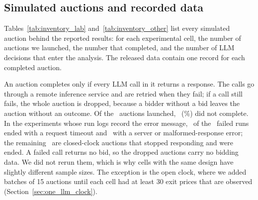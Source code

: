 \documentclass[acmsmall,screen,review]{acmart}
\newif\ifrevisionmark \revisionmarktrue
\newenvironment{revblock}{\color{blue}}{}
\newenvironment{revblock}{}{}
\begin{document}
\begin{revblock}
\subsection{Simulated auctions and recorded data}\label{app:data_inventory}
Tables~\ref{tab:inventory_lab} and~\ref{tab:inventory_other} list every simulated auction behind the reported results: for each experimental cell, the number of auctions we launched, the number that completed, and the number of LLM decisions that enter the analysis. The released data contain one record for each completed auction.

An auction completes only if every LLM call in it returns a response. The calls go through a remote inference service and are retried when they fail; if a call still fails, the whole auction is dropped, because a bidder without a bid leaves the auction without an outcome. Of the \InvAttempted\ auctions launched, \InvFailed\ (\InvFailedPct\%) did not complete. In the experiments whose run logs record the error message, \InvTimeout\ of the \InvFailedRuns\ failed runs ended with a request timeout and \InvServer\ with a server or malformed-response error; the remaining \InvStalled\ are closed-clock auctions that stopped responding and were ended. A failed call returns no bid, so the dropped auctions carry no bidding data. We did not rerun them, which is why cells with the same design have slightly different sample sizes. The exception is the open clock, where we added batches of 15 auctions until each cell had at least 30 exit prices that are observed (Section~\ref{sec:one_llm_clock}).

\begin{table}[htbp]
\centering
\small
\ifrevisionmark\color{blue}\fi
\resizebox{\linewidth}{!}{}
\caption{\textbf{Auctions in the laboratory formats}, $N=3$ bidders, one round per auction. Each cell gives completed / attempted auctions, with the number of LLM decisions used in the analysis in parentheses. Sealed-bid private-value auctions contribute three bids each. Common-value auctions contribute one winner profit each. Clock auctions have one LLM bidder and contribute one exit price each; in the open clock, auctions the LLM wins end before it exits and are not used, so the open-clock attempts include the added batches. $^{r}$: replacement model (Section~\ref{sec:models}). All non-GPT-4o models run at $T=0.5$.}
\label{tab:inventory_lab}
\end{table}

\begin{table}[htbp]
\centering
\small
\ifrevisionmark\color{blue}\fi

\caption{\textbf{Auctions in the other experiments.} Decisions used: winner profits (common value), bids (repeated auctions and description experiments), and auction trajectories (eBay-style). Repeated auctions run sessions of 15 rounds with three bidders. The standard description pools two independently run instances of the standard second-price description (Section~\ref{session:Intervention}).}
\label{tab:inventory_other}
\end{table}
\end{revblock}
\end{document}
